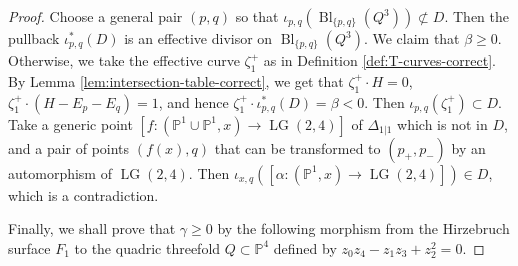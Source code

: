 \documentclass[10pt]{amsart}
\theoremstyle{definition}
\newcommand{\LG}{\operatorname{LG}}
\newcommand{\Bl}{\operatorname{Bl}}
\newcommand{\PP}{\mathbb{P}}
\theoremstyle{plain} %
\begin{document}
\begin{proof}
Choose a general pair $(p,q)$ so that $\iota_{p,q}(\Bl_{\{p,q\}}(Q^3))\not\subset D$. Then the pullback $\iota_{p,q}^*(D)$ is an effective divisor on $\Bl_{\{p,q\}}(Q^3)$.
We claim that $\beta\geq0$. Otherwise, we take the effective curve $\zeta^+_1$ as in Definition \ref{def:T-curves-correct}. By Lemma \ref{lem:intersection-table-correct}, we get that
$\zeta^+_1\cdot H=0$, $\zeta^+_1\cdot (H-E_p-E_q)=1$, and hence
$\zeta^+_1\cdot\iota_{p,q}^*(D)=\beta<0$. Then $\iota_{p,q}(\zeta^+_1)\subset D$. 
Take a generic point $[f\colon (\PP^1\cup\PP^1,x)\rightarrow \LG(2,4)]$ of $\Delta_{1|1}$ which is not in $D$, and a pair of points $(f(x),q)$ that can be transformed to $(p_+,p_-)$ by an automorphism of $\LG(2,4)$. Then $\iota_{x,q}([\alpha\colon (\PP^1,x)\rightarrow \LG(2,4)])\in D$, which is a contradiction.

Finally, we shall prove that $\gamma\geq 0$ by the following morphism from the Hirzebruch surface $F_1$ to the quadric threefold $Q\subset\PP^4$ defined by $z_0z_4-z_1z_3+z_2^2=0$.


\end{proof}
\end{document}
